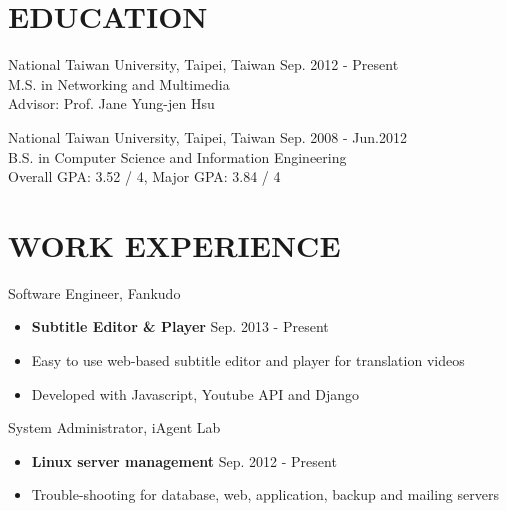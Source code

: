 \documentclass[margin]{resume}
\begin{document}
 
 

\address{
    4F., No.10, Aly. 4, Ln. 201, Yucheng St., \\
    Nangang Dist., Taipei City 115, \\
    Taiwan (R.O.C)
}

\address{
    \hfill +886-923-869-910 \\
    \hfill john.lin.chichin@gmail.com \\
    \hfill \url{http://github.com/averangeall}
}

\begin{resume}
 
\section{EDUCATION}
National Taiwan University, Taipei, Taiwan \hfill Sep. 2012 - Present \\
M.S. in Networking and Multimedia \\
Advisor: Prof. Jane Yung-jen Hsu
 
National Taiwan University, Taipei, Taiwan \hfill Sep. 2008 - Jun.2012 \\
B.S. in Computer Science and Information Engineering \\
Overall GPA: 3.52 / 4, Major GPA: 3.84 / 4


\section{WORK EXPERIENCE}
Software Engineer, Fankudo
\begin{itemize} \itemsep -2pt
    \item[] {\bf Subtitle Editor \& Player} \hfill Sep. 2013 - Present
    \item[] Easy to use web-based subtitle editor and player for translation videos
    \item[] Developed with Javascript, Youtube API and Django
\end{itemize}

System Administrator, iAgent Lab
\begin{itemize} \itemsep -2pt
    \item[] {\bf Linux server management} \hfill Sep. 2012 - Present
    \item[] Trouble-shooting for database, web, application, backup and mailing servers
\end{itemize}


\end{resume}
\end{document}
